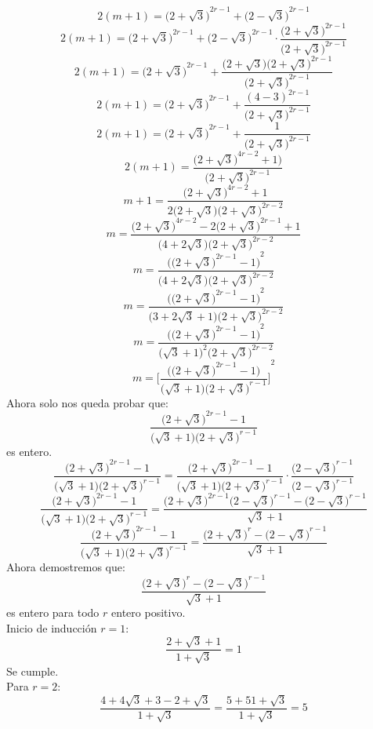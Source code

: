 \documentclass{book}
\begin{document}
\begin{enumerate}
        $$2(m+1)={\big(2+\sqrt{3}\big)}^{2r-1}+{\big(2-\sqrt{3}\big)}^{2r-1}$$
        $$2(m+1)={\big(2+\sqrt{3}\big)}^{2r-1}+{\big(2-\sqrt{3}\big)}^{2r-1}\cdot\frac{{\big(2+\sqrt{3}\big)}^{2r-1}}{{\big(2+\sqrt{3}\big)}^{2r-1}}$$
        $$2(m+1)={\big(2+\sqrt{3}\big)}^{2r-1}+\frac{{\big(2+\sqrt{3}\big)\big(2+\sqrt{3}\big)}^{2r-1}}{{\big(2+\sqrt{3}\big)}^{2r-1}} $$
        $$2(m+1)={\big(2+\sqrt{3}\big)}^{2r-1}+\frac{{(4-3)}^{2r-1}}{{\big(2+\sqrt{3}\big)}^{2r-1}} $$
        $$2(m+1)={\big(2+\sqrt{3}\big)}^{2r-1}+\frac{1}{{\big(2+\sqrt{3}\big)}^{2r-1}}$$
        $$2(m+1)=\frac{{\big(2+\sqrt{3}\big)}^{4r-2}+1)}{{\big(2+\sqrt{3}\big)}^{2r-1}}$$
        $$m+1=\frac{{\big(2+\sqrt{3}\big)}^{4r-2}+1}{2\big(2+\sqrt{3}\big){\big(2+\sqrt{3}\big)}^{2r-2}}$$
        $$m=\frac{{\big(2+\sqrt{3}\big)}^{4r-2}-2{\big(2+\sqrt{3}\big)}^{2r-1}+1}{\big(4+2\sqrt{3}\big){\big(2+\sqrt{3}\big)}^{2r-2} }$$
        $$m=\frac{{\Big({\big(2+\sqrt{3}\big)}^{2r-1}-1\Big)}^2}{ \big(4+2\sqrt{3}\big){\big(2+\sqrt{3}\big)}^{2r-2} }$$
        $$m=\frac{{\Big({\big(2+\sqrt{3}\big)}^{2r-1}-1\Big)}^2}{ \big(3+2\sqrt{3}+1\big){\big(2+\sqrt{3}\big)}^{2r-2}}$$
        $$m=\frac{{\Big({\big(2+\sqrt{3}\big)}^{2r-1}-1\Big)}^2}{{\big(\sqrt{3}+1\big)}^2{\big(2+\sqrt{3}\big)}^{2r-2}}$$
        $$m={\Bigg[\frac{\Big({\big(2+\sqrt{3}\big)}^{2r-1}-1\Big)}{\big(\sqrt{3}+1\big){\big(2+\sqrt{3}\big)}^{r-1}}\Bigg]}^2$$
        Ahora solo nos queda probar que:
        $$\frac{{\big(2+\sqrt{3}\big)}^{2r-1}-1}{\big(\sqrt{3}+1\big){\big(2+\sqrt{3}\big)}^{r-1}}$$
        es entero.
        $$\frac{{\big(2+\sqrt{3}\big)}^{2r-1}-1}{\big(\sqrt{3}+1\big){\big(2+\sqrt{3}\big)}^{r-1}}=\frac{{\big(2+\sqrt{3}\big)}^{2r-1}-1}{\big(\sqrt{3}+1\big){\big(2+\sqrt{3}\big)}^{r-1}}\cdot\frac{{\big(2-\sqrt{3}\big)}^{r-1}}{{\big(2-\sqrt{3}\big)}^{r-1}}$$
        $$\frac{{\big(2+\sqrt{3}\big)}^{2r-1}-1}{\big(\sqrt{3}+1\big){\big(2+\sqrt{3}\big)}^{r-1}}=\frac{{\big(2+\sqrt{3}\big)}^{2r-1}{\big(2-\sqrt{3}\big)}^{r-1}-{\big(2-\sqrt{3}\big)}^{r-1}}{\sqrt{3}+1}$$
        $$\frac{{\big(2+\sqrt{3}\big)}^{2r-1}-1}{\big(\sqrt{3}+1\big){\big(2+\sqrt{3}\big)}^{r-1}}=\frac{{\big(2+\sqrt{3}\big)}^{r}-{\big(2-\sqrt{3}\big)}^{r-1}}{\sqrt{3}+1}$$
        Ahora demostremos que:
        $$\frac{{\big(2+\sqrt{3}\big)}^{r}-{\big(2-\sqrt{3}\big)}^{r-1}}{\sqrt{3}+1}$$
        es entero para todo $r$ entero positivo.\\
        Inicio de inducción $r=1$:
        $$\frac{2+\sqrt{3}+1}{1+\sqrt{3}}=1$$
        Se cumple.\\
        Para $r=2$:
        $$\frac{4+4\sqrt{3}+3-2+\sqrt{3}}{1+\sqrt{3}}=\frac{5+51+\sqrt{3}}{1+\sqrt{3}}=5$$

\end{enumerate}
\end{document}
